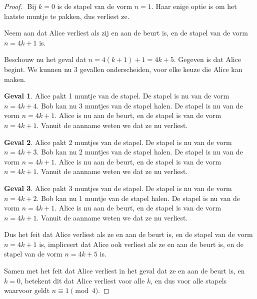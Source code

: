 \documentclass[12pt, dutch, a4paper]{article}
\theoremstyle{definition}
\newtheorem{case}{Geval}
\begin{document}
\begin{proof} $ $ \newline
  Bij $k = 0$ is de stapel van de vorm $n = 1$. 
  Haar enige optie is om het laatste muntje te pakken, dus verliest ze.

  Neem aan dat Alice verliest als zij 
  en aan de beurt is, en de stapel van de vorm $n = 4k + 1$ is.

  Beschouw nu het geval dat $n = 4(k + 1) + 1 = 4k + 5$.
  Gegeven is dat Alice begint. We kunnen nu 3 gevallen onderscheiden, 
  voor elke keuze die Alice kan maken.
  \begin{case}
    Alice pakt 1 muntje van de stapel. 
    De stapel is nu van de vorm $n = 4k + 4$. 
    Bob kan nu 3 muntjes van de stapel halen. De stapel is nu van de vorm $n = 4k + 1$. 
    Alice is nu aan de beurt, en de stapel is van de vorm $n = 4k + 1$.
    Vanuit de aanname weten we dat ze nu verliest.
  \end{case}

  \begin{case}
    Alice pakt 2 muntjes van de stapel.
    De stapel is nu van de vorm $n = 4k + 3$. 
    Bob kan nu 2 muntjes van de stapel halen. De stapel is nu van de vorm $n = 4k + 1$.
    Alice is nu aan de beurt, en de stapel is van de vorm $n = 4k + 1$.
    Vanuit de aanname weten we dat ze nu verliest.
  \end{case}

  \begin{case}
    Alice pakt 3 muntjes van de stapel.
    De stapel is nu van de vorm $n = 4k + 2$. 
    Bob kan nu 1 muntje van de stapel halen. De stapel is nu van de vorm $n = 4k + 1$.
    Alice is nu aan de beurt, en de stapel is van de vorm $n = 4k + 1$.
    Vanuit de aanname weten we dat ze nu verliest.
  \end{case}

  Dus het feit dat Alice verliest als ze 
  en aan de beurt is, en de stapel van de vorm $n = 4k + 1$ is,
  impliceert dat Alice ook verliest als ze 
  en aan de beurt is, en de stapel van de vorm $n = 4k + 5$ is.

  Samen met het feit dat Alice verliest in het geval dat ze en aan de beurt is, en $k = 0$, 
  betekent dit dat Alice verliest voor alle $k$, 
  en dus voor alle stapels waarvoor geldt $n \equiv 1 \pmod{4}$. 

\end{proof} 
\end{document}
